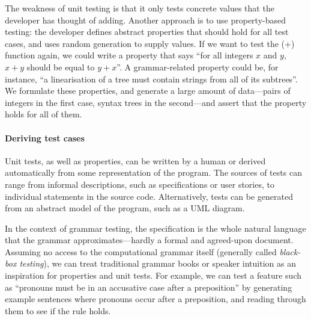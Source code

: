 The weakness of unit testing is that it only tests concrete values
that the developer has thought of adding. Another approach is to use
property-based testing: the developer defines abstract properties that
should hold for all test cases, and uses random generation to supply
values. If we want to test the (+) function again, we could write a
property that says ``for all integers $x$ and $y$, $x+y$ should be
equal to $y+x$''.  A grammar-related property could be, for instance,
``a linearisation of a tree must contain strings from all of its
subtrees''.  We formulate these properties, and generate a large
amount of data---pairs of integers in the first case, syntax trees in
the second---and assert that the property holds for all of them.



\paragraph{Deriving test cases}

Unit tests, as well as properties, can be written by a human or
derived automatically from some representation of the program. The
sources of tests can range from informal descriptions, such as
specifications or user stories, to individual statements in the source
code. Alternatively, tests can be generated from an abstract model of
the program, such as a UML diagram.

In the context of grammar testing, the specification is the whole
natural language that the grammar approximates---hardly a formal and
agreed-upon document. Assuming no access to the computational grammar
itself (generally called \emph{black-box testing}), we can treat traditional
grammar books or speaker intuition as an inspiration for properties
and unit tests. For example, we can test a feature such as ``pronouns
must be in an accusative case after a preposition'' by generating
example sentences where pronouns occur after a preposition, and
reading through them to see if the rule holds.

